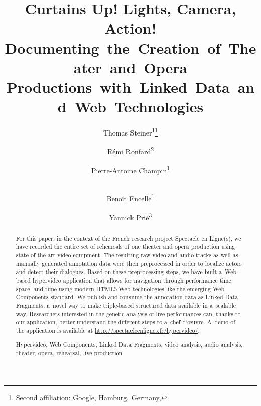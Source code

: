 \documentclass[runningheads,a4paper]{llncs}
\newcommand{\keywords}[1]{\par\addvspace\baselineskip
\noindent\keywordname\enspace\ignorespaces#1}
\begin{document}
\mainmatter

\title{Curtains Up! Lights, Camera, Action! \mbox{\enspace Documenting}~the~Creation~of~Theater~and~Opera \mbox{Productions}~with~Linked~Data~and~Web~\mbox{Technologies}}

\titlerunning{ }

\author{
  Thomas Steiner\textsuperscript{1}\thanks{Second affiliation: Google, Hamburg, Germany, } \and
  Rémi Ronfard\textsuperscript{2} \and
  Pierre-Antoine Champin\textsuperscript{1} \and \\
  Benoît Encelle\textsuperscript{1}\and
  Yannick Prié\textsuperscript{3}
}
%
\authorrunning{ }


\maketitle

\begin{abstract}
For this paper, in the context of the French research project Spectacle en Ligne(s),
we have recorded the entire set of rehearsals of one theater and opera production
using state-of-the-art video equipment.
The resulting raw video and audio tracks as well as manually generated annotation data
were then preprocessed in order to localize actors and detect their dialogues.
Based on these preprocessing steps, we have built a~Web-based hypervideo application
that allows for navigation through performance time, space, and time
using modern HTML5 Web technologies like the emerging Web Components standard.
We publish and consume the annotation data as Linked Data Fragments,
a~novel way to make triple-based structured data available in a~scalable way.
Researchers interested in the genetic analysis of live performances can,
thanks to our application, better understand the different steps to a~chef d’œuvre.
A~demo of the application is available at \url{http://spectacleenlignes.fr/hypervideo/}.

\keywords{Hypervideo, Web Components, Linked Data Fragments, video analysis, audio analysis, theater, opera, rehearsal, live production}
\end{abstract}
\end{document}
